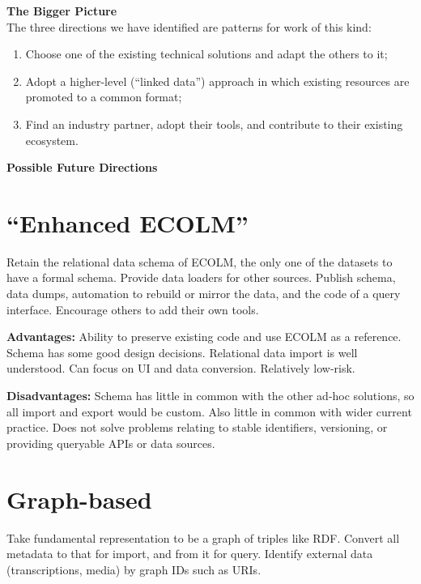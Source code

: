 \documentclass[a0,landscape]{a0poster}
\begin{document}
\begin{multicols}{3}
\begin{sloppypar}
  \vspace{1cm}
  \noindent\textbf{\LARGE The Bigger Picture}\\

  \noindent The three directions we have identified are patterns for work
  of this kind:

  \begin{enumerate}
  \item Choose one of the existing technical solutions and adapt the
    others to it;
  \item Adopt a higher-level (``linked data'') approach in which
    existing resources are promoted to a common format;
  \item Find an industry partner, adopt their tools, and contribute to
    their existing ecosystem.
  \end{enumerate}

  \columnbreak

  \noindent\textbf{\LARGE Possible Future Directions}\\
  \vspace{-2cm}
  \section{``Enhanced ECOLM''}

  Retain the relational data schema of ECOLM, the only one of the
  datasets to have a formal schema. Provide data loaders for other
  sources. Publish schema, data dumps, automation to rebuild or mirror
  the data, and the code of a query interface. Encourage others to
  add their own tools.

  \noindent\textbf{Advantages:} Ability to preserve existing code and
  use ECOLM as a reference. Schema has some good design
  decisions. Relational data import is well understood. Can focus on
  UI and data conversion. Relatively low-risk.

  \noindent\textbf{Disadvantages:} Schema has little in common with
  the other ad-hoc solutions, so all import and export would be
  custom. Also little in common with wider current practice. Does not
  solve problems relating to stable identifiers, versioning, or
  providing queryable APIs or data sources.

  \section{Graph-based}

  Take fundamental representation to be a graph of triples like
  RDF. Convert all metadata to that for import, and from it for
  query. Identify external data (transcriptions, media) by graph IDs
  such as URIs.


\end{sloppypar}
\end{multicols}
\end{document}
